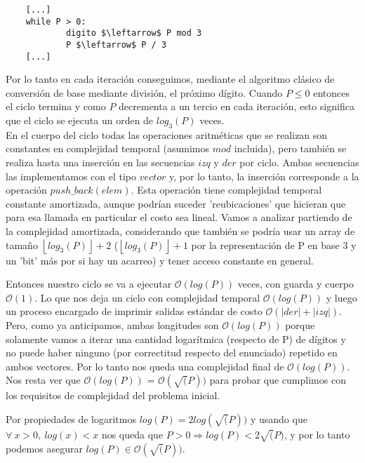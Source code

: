 	\begin{lstlisting}
	[...]
	while P > 0:
        	digito $\leftarrow$ P mod 3
        	P $\leftarrow$ P / 3
	[...]
	\end{lstlisting}

	Por lo tanto en cada iteración conseguimos, mediante el algoritmo clásico de conversión de base mediante división, el próximo dígito. Cuando $P \leq 0$ entonces el ciclo termina y como $P$ decrementa a un tercio en cada iteración, esto significa que el ciclo se ejecuta un orden de $log_3(P)$ veces.
	\\

	En el cuerpo del ciclo todas las operaciones aritméticas que se realizan son constantes en complejidad temporal (asumimos $mod$ incluida), pero también se realiza hasta una inserción en las secuencias $izq$ y $der$ por ciclo. Ambas secuencias las implementamos con el tipo $vector$ y, por lo tanto, la inserción corresponde a la operación $push\_back(elem)$. Esta operación tiene complejidad temporal constante amortizada, aunque podrían suceder 'reubicaciones' que hicieran que para esa llamada en particular el costo sea lineal. Vamos a analizar partiendo de la complejidad amortizada, considerando que también se podría usar un array de tamaño $\left \lfloor{log_3(P)}\right \rfloor + 2$ ($\left \lfloor{log_3(P)}\right \rfloor + 1$ por la representación de P en base 3 y un 'bit' más por si hay un acarreo) y tener acceso constante en general.

	Entonces nuestro ciclo se va a ejecutar $\mathcal{O} (log(P))$ veces, con guarda y cuerpo $\mathcal{O} (1)$. Lo que nos deja un ciclo con complejidad temporal $\mathcal{O} (log(P))$ y luego un proceso encargado de imprimir salidas estándar de costo $\mathcal{O} (|der| + |izq|)$. Pero, como ya anticipamos, ambas longitudes son $\mathcal{O} (log(P))$ porque solamente vamos a iterar una cantidad logarítmica (respecto de P) de dígitos y no puede haber ninguno (por correctitud respecto del enunciado) repetido en ambos vectores. Por lo tanto nos queda una complejidad final de $\mathcal{O} (log(P))$.
	\\

	Nos resta ver que $\mathcal{O} (log(P))$ = $\mathcal{O} (\sqrt(P))$ para probar que cumplimos con los requisitos de complejidad del problema inicial.

	Por propiedades de logaritmos $log(P) = 2log(\sqrt(P))$ y usando que $\forall \ x > 0, \ log(x) < x$ nos queda que $ P > 0 \Longrightarrow log(P) < 2\sqrt(P)$, y por lo tanto podemos asegurar $log(P) \in \mathcal{O} (\sqrt(P))$.

